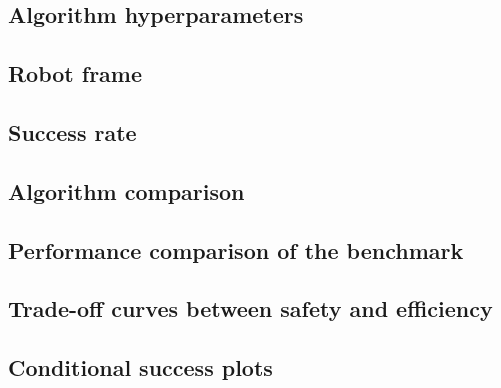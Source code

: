 \clearpage

\subsection{Algorithm hyperparameters}
\label{appendix: hyperparameters}


\subsection{Robot frame}
\label{appendix: frame}

\clearpage
\subsection{Success rate}
\label{appendix: success_rate}


\clearpage
\subsection{Algorithm comparison}
\label{appendix: conditional_success_rate}


\clearpage

% 
\subsection{Performance comparison of the benchmark}
\label{app: benchmark_performance_app}


\subsection{Trade-off curves between safety and efficiency}
\label{app: param_tuning_app}


\clearpage
\subsection{Conditional success plots}
\label{app: conditional_success_app}

